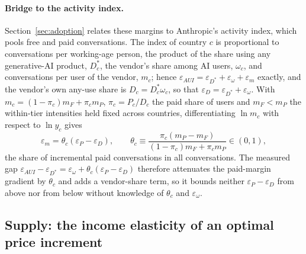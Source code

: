 \documentclass[11pt]{article}
\theoremstyle{definition}
\theoremstyle{remark}
\begin{document}
\paragraph{Bridge to the activity index.} Section~\ref{sec:adoption} relates these margins to Anthropic's activity index, which pools free and paid conversations. The index of country $c$ is proportional to conversations per working-age person, the product of the share using any generative-AI product, $D^*_c$, the vendor's share among AI users, $\omega_c$, and conversations per user of the vendor, $m_c$; hence $\varepsilon_{AUI}=\varepsilon_{D^*}+\varepsilon_\omega+\varepsilon_m$ exactly, and the vendor's own any-use share is $D_c=D^*_c\omega_c$, so that $\varepsilon_D=\varepsilon_{D^*}+\varepsilon_\omega$. With $m_c=(1-\pi_c)m_F+\pi_cm_P$, $\pi_c=P_c/D_c$ the paid share of users and $m_F<m_P$ the within-tier intensities held fixed across countries, differentiating $\ln m_c$ with respect to $\ln y_c$ gives
\begin{equation}
 \varepsilon_m=\theta_c(\varepsilon_P-\varepsilon_D),\qquad \theta_c\equiv\frac{\pi_c(m_P-m_F)}{(1-\pi_c)m_F+\pi_cm_P}\in(0,1),
 \label{eq:bridge}
\end{equation}
the share of incremental paid conversations in all conversations. The measured gap $\varepsilon_{AUI}-\varepsilon_{D^*}=\varepsilon_\omega+\theta_c(\varepsilon_P-\varepsilon_D)$ therefore attenuates the paid-margin gradient by $\theta_c$ and adds a vendor-share term, so it bounds neither $\varepsilon_P-\varepsilon_D$ from above nor from below without knowledge of $\theta_c$ and $\varepsilon_\omega$.

\subsection{Supply: the income elasticity of an optimal price increment}\label{app:supply}
\end{document}
